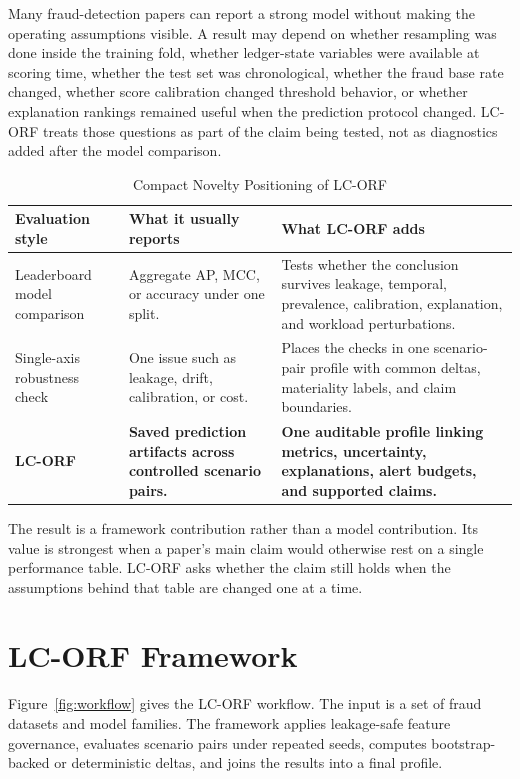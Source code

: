 \documentclass{ieeeaccess}
\begin{document}
Many fraud-detection papers can report a strong model without making the operating assumptions visible. A result may depend on whether resampling was done inside the training fold, whether ledger-state variables were available at scoring time, whether the test set was chronological, whether the fraud base rate changed, whether score calibration changed threshold behavior, or whether explanation rankings remained useful when the prediction protocol changed. LC-ORF treats those questions as part of the claim being tested, not as diagnostics added after the model comparison.

\begin{table}[!htbp]
\caption{Compact Novelty Positioning of LC-ORF}
\label{tab:novelty_positioning}
\centering
\footnotesize
\setlength{\tabcolsep}{3pt}
\renewcommand{\arraystretch}{1.14}
\begin{tabularx}{\columnwidth}{|>{\raggedright\arraybackslash}p{}|>{\raggedright\arraybackslash}p{}|>{\raggedright\arraybackslash}X|}
\hline
\textbf{Evaluation style} & \textbf{What it usually reports} & \textbf{What LC-ORF adds}\\
\hline
Leaderboard model comparison & Aggregate AP, MCC, or accuracy under one split. & Tests whether the conclusion survives leakage, temporal, prevalence, calibration, explanation, and workload perturbations.\\
\hline
Single-axis robustness check & One issue such as leakage, drift, calibration, or cost. & Places the checks in one scenario-pair profile with common deltas, materiality labels, and claim boundaries.\\
\hline
\textbf{LC-ORF} & \textbf{Saved prediction artifacts across controlled scenario pairs.} & \textbf{One auditable profile linking metrics, uncertainty, explanations, alert budgets, and supported claims.}\\
\hline
\end{tabularx}
\end{table}

The result is a framework contribution rather than a model contribution. Its value is strongest when a paper's main claim would otherwise rest on a single performance table. LC-ORF asks whether the claim still holds when the assumptions behind that table are changed one at a time.

\section{LC-ORF Framework}
\label{sec:framework}
Figure~\ref{fig:workflow} gives the LC-ORF workflow. The input is a set of fraud datasets and model families. The framework applies leakage-safe feature governance, evaluates scenario pairs under repeated seeds, computes bootstrap-backed or deterministic deltas, and joins the results into a final profile.
\end{document}
